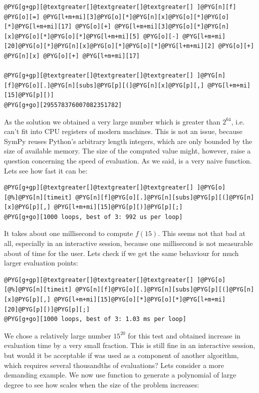 \begin{Verbatim}[commandchars=@\[\]]
@PYG[g+gp][@textgreater[]@textgreater[]@textgreater[] ]@PYG[n][f] @PYG[o][=] @PYG[l+m+mi][3]@PYG[o][*]@PYG[n][x]@PYG[o][*]@PYG[o][*]@PYG[l+m+mi][17] @PYG[o][+] @PYG[l+m+mi][3]@PYG[o][*]@PYG[n][x]@PYG[o][*]@PYG[o][*]@PYG[l+m+mi][5] @PYG[o][-] @PYG[l+m+mi][20]@PYG[o][*]@PYG[n][x]@PYG[o][*]@PYG[o][*]@PYG[l+m+mi][2] @PYG[o][+] @PYG[n][x] @PYG[o][+] @PYG[l+m+mi][17]

@PYG[g+gp][@textgreater[]@textgreater[]@textgreater[] ]@PYG[n][f]@PYG[o][.]@PYG[n][subs]@PYG[p][(]@PYG[n][x]@PYG[p][,] @PYG[l+m+mi][15]@PYG[p][)]
@PYG[g+go][295578376007082351782]
\end{Verbatim}
\noindent
As the solution we obtained a very large number which is greater than $2^{64}$, i.e. can't fit
into CPU registers of modern machines. This is not an issue, because SymPy reuses Python's
arbitrary length integers, which are only bounded by the size of available memory. The size
of the computed value might, however, raise a question concerning the speed of evaluation. As
we said,  is a very naive function. Lets see how fast it can be:

\begin{Verbatim}[commandchars=@\[\]]
@PYG[g+gp][@textgreater[]@textgreater[]@textgreater[] ]@PYG[o][@%]@PYG[n][timeit] @PYG[n][f]@PYG[o][.]@PYG[n][subs]@PYG[p][(]@PYG[n][x]@PYG[p][,] @PYG[l+m+mi][15]@PYG[p][)]@PYG[p][;]
@PYG[g+go][1000 loops, best of 3: 992 us per loop]
\end{Verbatim}
\noindent
It takes  about one millisecond to compute $f(15)$. This seems not that bad at all,
especially in an interactive session, because one millisecond is not measurable about of time
for the user. Lets check if we get the same behaviour for much larger evaluation points:

\begin{Verbatim}[commandchars=@\[\]]
@PYG[g+gp][@textgreater[]@textgreater[]@textgreater[] ]@PYG[o][@%]@PYG[n][timeit] @PYG[n][f]@PYG[o][.]@PYG[n][subs]@PYG[p][(]@PYG[n][x]@PYG[p][,] @PYG[l+m+mi][15]@PYG[o][*]@PYG[o][*]@PYG[l+m+mi][20]@PYG[p][)]@PYG[p][;]
@PYG[g+go][1000 loops, best of 3: 1.03 ms per loop]
\end{Verbatim}
\noindent
We chose a relatively large number $15^{20}$ for this test and obtained increase in evaluation
time by a very small fraction. This is still fine in an interactive session, but would it be
acceptable if  was used as a component of another algorithm, which requires several
thousandths of evaluations? Lets consider a more demanding example. We now use 
function to generate a polynomial of large degree to see how  scales when the size of
the problem increases:

